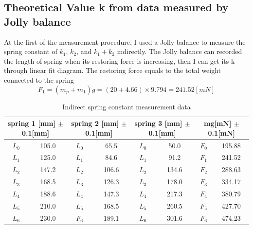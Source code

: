 \documentclass[12pt]{article}
\begin{document}
\subsection{Theoretical Value k from data measured by Jolly balance}
At the first of the measurement procedure, I used a Jolly balance to measure the spring constant of $k_1$, $k_2$, and $k_1+k_2$ indirectly. The Jolly balance can recorded the length of spring when its restoring force is increasing, then I can get its k through linear fit diagram. The restoring force equals to the total weight connected to the spring
$$F_1=(m_p+m_1)g=(20+4.66)\times9.794=241.52[mN]$$
\begin{table}[H]
\centering
\begin{tabular}{|c|c|c|c|c|c|c|c|}
\hline
\multicolumn{2}{|c|}{spring 1 {[}mm{]} $\pm$ 0.1{[}mm{]}} & \multicolumn{2}{c|}{spring 2 {[}mm{]} $\pm$ 0.1{[}mm{]}} & \multicolumn{2}{c|}{spring 3 {[}mm{]} $\pm$ 0.1{[}mm{]}}& \multicolumn{2}{c|}{mg[mN] $\pm$ 0.1[mN]} \\ \hline
$L_0$                           & 105.0     &      $L_0$            & 65.5                 &    $L_0$              & 50.0 &$F_0$     &195.88           \\ \hline
$L_1$                             & 125.0     &    $L_1$               & 84.6                 &   $L_1$                & 91.2  &$F_1$   &241.52            \\ \hline
   $L_2$                           & 147.2     &      $L_2$             & 106.6                &    $L_2$               & 134.6 &$F_2$   &288.63            \\ \hline
    $L_3$                          & 168.5     &      $L_3$             & 126.3                &      $L_3$             & 178.0 &$F_3$   &334.17           \\ \hline
      $L_4$                        & 188.6     &       $L_4$           & 147.3                &       $L_4$           & 217.3  &$F_4$   &380.79           \\ \hline
     $L_5$                        & 210.0     &    $L_5$             & 168.5                &       $L_5$          & 260.5  &$F_5$    &427.70          \\ \hline
$L_6$     & 230.0     &      $F_6$             & 189.1                &   $L_6$   & 301.6   &$F_6$      &474.23       \\ \hline
\end{tabular}
\caption{Indirect spring constant measurement data}
\end{table}
\end{document}
